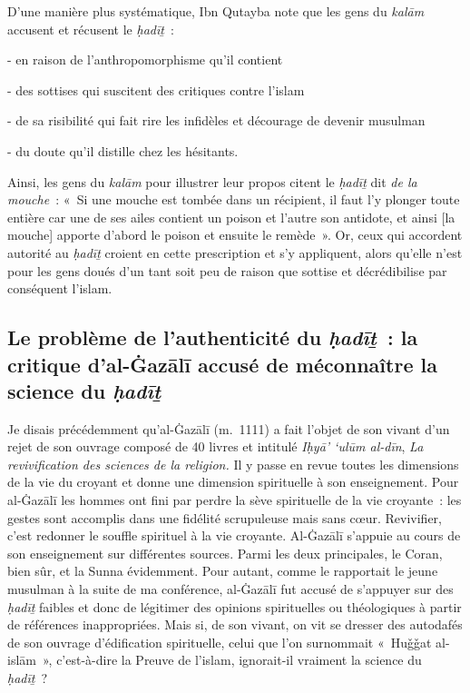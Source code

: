 D'une manière plus systématique, Ibn Qutayba note que les gens du
\emph{kalām} accusent et récusent le \emph{ḥadīṯ}~:

- en raison de l'anthropomorphisme qu'il contient

- des sottises qui suscitent des critiques contre l'islam

- de sa risibilité qui fait rire les infidèles et décourage de devenir
musulman

- du doute qu'il distille chez les hésitants.

Ainsi, les gens du \emph{kalām} pour illustrer leur propos citent le
\emph{ḥadīṯ} dit \emph{de la mouche~}: «~Si une mouche est tombée dans
un récipient, il faut l'y plonger toute entière car une de ses ailes
contient un poison et l'autre son antidote, et ainsi {[}la mouche{]}
apporte d'abord le poison et ensuite le remède~».
Or, ceux qui accordent autorité au \emph{ḥadīṯ} croient en cette
prescription et s'y appliquent, alors qu'elle n'est pour les gens doués
d'un tant soit peu de raison que sottise et décrédibilise par conséquent
l'islam.


\subsection{Le problème de l'authenticité du
\emph{ḥadīṯ}~: la critique d'al-Ġazālī accusé de méconnaître la science
du \emph{ḥadīṯ}
}

Je disais précédemment qu'al-Ġazālī \label{theol:AlGazali18} (m.~1111) a fait l'objet de son
vivant d'un rejet de son ouvrage composé de 40 livres et intitulé
\emph{Iḥyā' `ulūm al-dīn}, \emph{La revivification des sciences de la
religion.} Il y passe en revue toutes les dimensions de la vie du
croyant et donne une dimension spirituelle à son enseignement. Pour
al-Ġazālī les hommes ont fini par perdre la sève spirituelle de la vie
croyante~: les gestes sont accomplis dans une fidélité scrupuleuse mais
sans cœur. Revivifier, c'est redonner le souffle spirituel à la vie
croyante. Al-Ġazālī \label{theol:AlGazali19} s'appuie au cours de son enseignement sur
différentes sources. Parmi les deux principales, le Coran, bien sûr, et
la Sunna évidemment. Pour autant, comme le rapportait le jeune musulman
à la suite de ma conférence, al-Ġazālī fut accusé de s'appuyer sur des
\emph{ḥadīṯ} faibles et donc de légitimer des opinions spirituelles ou
théologiques à partir de références inappropriées. Mais si, de son
vivant, on vit se dresser des autodafés de son ouvrage d'édification
spirituelle, celui que l'on surnommait «~Huǧǧat al-islām~», c'est-à-dire
la Preuve de l'islam, ignorait-il vraiment la science du \emph{ḥadīṯ}~?


